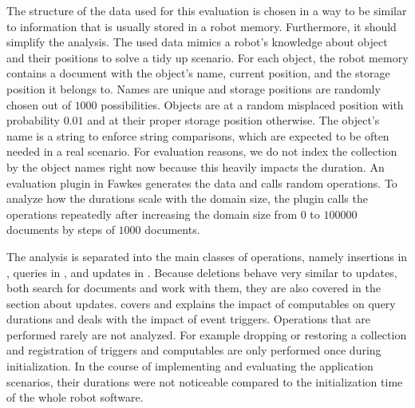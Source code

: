 The structure of the data used for this evaluation is chosen in a way
to be similar to information that is usually stored in a robot
memory. Furthermore, it should simplify the analysis. The used data mimics
a robot's knowledge about object and their positions to solve a tidy
up scenario. For each object, the robot memory contains a document
with the object's name, current position, and the storage position it
belongs to. Names are unique and storage positions are randomly chosen
out of $1000$ possibilities. Objects are at a random misplaced position with
probability $0.01$ and at their proper storage position otherwise. The
object's name is a string to enforce string comparisons, which are
expected to be often needed in a real scenario. For evaluation
reasons, we do not index the collection by the object names right now
because this heavily impacts the duration. An evaluation plugin in
Fawkes generates the data and calls random operations. To analyze how
the durations scale with the domain size, the plugin calls the
operations repeatedly after increasing the domain size from $0$ to
$100000$ documents by steps of $1000$ documents.

The analysis is separated into the main classes of operations, namely
insertions in , queries in
, and updates in . Because
deletions behave very similar to updates, both search for documents
and work with them, they are also covered in the section about
updates.  covers and explains the impact
of computables on query durations and  deals
with the impact of event triggers. Operations that are performed
rarely are not analyzed. For example dropping or restoring a collection and
registration of triggers and computables are only performed once
during initialization.  In the course of implementing and evaluating
the application scenarios, their durations were not noticeable compared
to the initialization time of the whole robot software.

